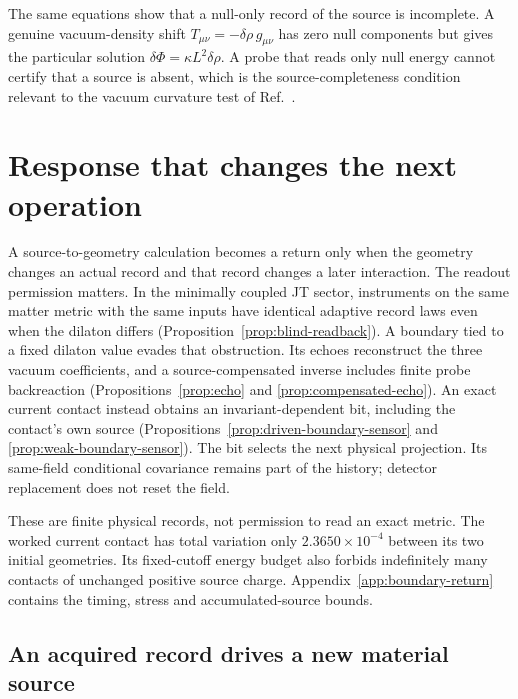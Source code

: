 The same equations show that a null-only record of the source is incomplete. A genuine vacuum-density shift $T_{\mu\nu}=-\delta\rho\,g_{\mu\nu}$ has zero null components but gives the particular solution $\delta\Phi=\kappa L^2\delta\rho$. A probe that reads only null energy cannot certify that a source is absent, which is the source-completeness condition relevant to the vacuum curvature test of Ref.~\cite{QRNV}.


\section{Response that changes the next operation}
\label{sec:physical-return}

A source-to-geometry calculation becomes a return only when the geometry
changes an actual record and that record changes a later interaction.
The readout permission matters. In the minimally coupled JT sector,
instruments on the same matter metric with the same inputs have identical
adaptive record laws even when the dilaton differs
(Proposition~\ref{prop:blind-readback}). A boundary tied to a fixed dilaton
value evades that obstruction. Its echoes reconstruct the three vacuum
coefficients, and a source-compensated inverse includes finite probe
backreaction (Propositions~\ref{prop:echo} and
\ref{prop:compensated-echo}). An exact current contact instead obtains an
invariant-dependent bit, including the contact's own source
(Propositions~\ref{prop:driven-boundary-sensor} and
\ref{prop:weak-boundary-sensor}). The bit selects the next physical
projection. Its same-field conditional covariance remains part of the
history; detector replacement does not reset the field.

These are finite physical records, not permission to read an exact metric.
The worked current contact has total variation only
$2.3650\times10^{-4}$ between its two initial geometries.
Its fixed-cutoff energy budget also forbids indefinitely many contacts of
unchanged positive source charge. Appendix~\ref{app:boundary-return}
contains the timing, stress and accumulated-source bounds.

\subsection{An acquired record drives a new material source}
\label{sec:record-actuated-source}

